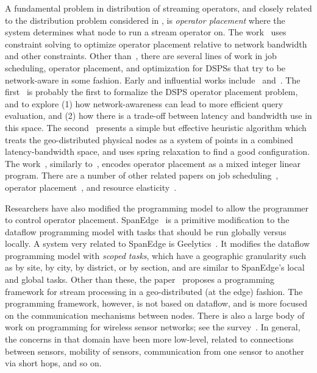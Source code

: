 A fundamental problem in distribution of streaming operators, and closely related to the distribution problem considered in ,
is \emph{operator placement} where the system determines what node to run a stream operator on.
The work~\cite{cardellini2016optimal} uses constraint solving to optimize operator placement relative to network bandwidth and other constraints.
Other than~\cite{cardellini2016optimal}, there are several lines of work in job scheduling, operator placement, and optimization for DSPSs that try to be network-aware in some fashion. Early and influential works include~\cite{ahmad2004network} and~\cite{pietzuch2006network}.
The first~\cite{ahmad2004network} is probably the first to formalize the DSPS operator placement problem, and to explore (1) how network-awareness can lead to more efficient query evaluation, and (2) how there is a trade-off between latency and bandwidth use in this space.
The second~\cite{pietzuch2006network} presents a simple but effective heuristic algorithm which treats the geo-distributed physical nodes as a system of points in a combined latency-bandwidth space, and uses spring relaxation to find a good configuration.
The work~\cite{gu2015general}, similarly to~\cite{cardellini2016optimal}, encodes operator placement as a mixed integer linear program.
There are a number of other related papers on job scheduling~\cite{aniello2013adaptive,xu2014tstorm,eidenbenz2016task,wolf2008soda,fu2019edgewise}, operator placement~\cite{bonfils2004adaptive,tziritas2016improving,rizou2010solving,lakshmanan2008placement},
and resource elasticity~\cite{cardellini2018decentralized,hochreiner2016elastic,cardellini2018optimal,dias2018dsp-survey}.

Researchers have also modified the programming model to allow the programmer to control operator placement.
SpanEdge~\cite{sajjad2016spanedge} is a primitive modification to the dataflow programming model with tasks that should be run globally versus locally.
A system very related to SpanEdge is Geelytics~\cite{cheng2015geelytics}.
It modifies the dataflow programming model with \emph{scoped tasks}, which have a geographic granularity such as by site, by city, by district, or by section, and are similar to SpanEdge's local and global tasks.
Other than these, the paper~\cite{renart2017datadrivenstreamedge} proposes a programming framework for stream processing in a geo-distributed (at the edge) fashion. The programming framework, however, is not based on dataflow, and is more focused on the communication mechanisms between nodes. There is also a large body of work on programming for wireless sensor networks; see the survey~\cite{mottola2011programming-wsn}. In general, the concerns in that domain have been more low-level, related to connections between sensors, mobility of sensors, communication from one sensor to another via short hops, and so on.

